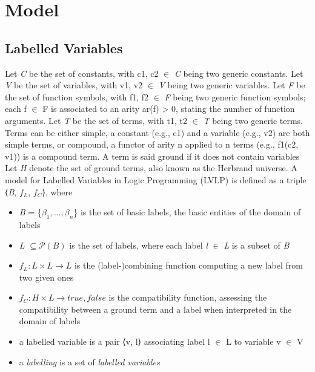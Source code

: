 \section{Model}\label{sec:model}

\subsection{Labelled Variables}\label{subsec:labelled_variables}

Let \textit{C} be the set of constants, with c1, c2 $\in$ \textit{C} being two generic constants. Let \textit{V} be the set of
variables, with v1, v2 $\in$ \textit{V} being two generic variables. Let \textit{F} be the set of function symbols, with
f1, f2 $\in$ \textit{F} being two generic function symbols; each f $\in$ F is associated to an arity ar(f) > 0,
stating the number of function arguments. Let \textit{T} be the set of terms, with t1, t2 $\in$ \textit{T} being two
generic terms. Terms can be either simple, a constant (e.g., c1) and a variable (e.g., v2) are both
simple terms, or compound, a functor of arity n applied to n terms (e.g., f1(c2, v1)) is a compound term. A term is said ground if it does not contain variables
Let \textit{H} denote the set of ground terms, also known as the Herbrand universe. A model for Labelled Variables in Logic Programming (LVLP) is defined as a triple ⟨\textit{B}, $f_L$, $f_C$⟩,
where
\begin{itemize}
    \item \textit{B} = \{$\beta_1, . . . , \beta_n$\} is the set of basic labels, the basic entities of the domain of labels
    \item \textit{L} $\subseteq \mathcal{P}(\textit{B}) $ is the set of labels, where each label \textit{l} $\in$ \textit{L} is a subset of \textit{B}
    \item $f_L : \textit{L} \times \textit{L} \rightarrow \textit{L}$ is the (label-)combining function computing a new label from two given ones
    \item $f_C : \textit{H} \times \textit{L} \rightarrow {true, false}$ is the compatibility function, assessing the compatibility between
    a ground term and a label when interpreted in the domain of labels
    \item a labelled variable is a pair ⟨v, l⟩ associating label l $\in$ L to variable v $\in$ V
    \item a \textit{labelling} is a set of \textit{labelled variables}
\end{itemize}

